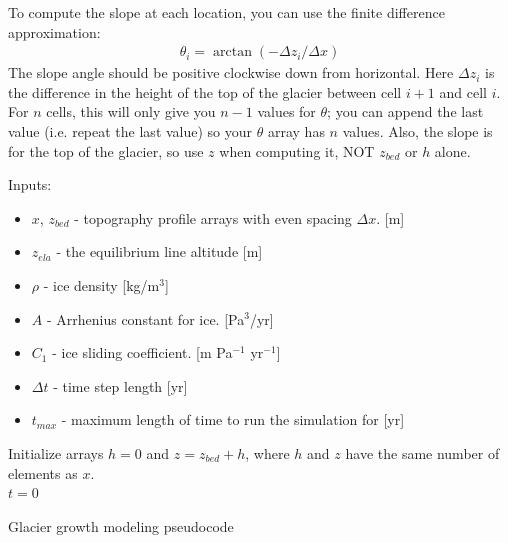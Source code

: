 \documentclass[11pt, oneside]{article}   	%
\begin{document}
To compute the slope at each location, you can use the finite difference approximation:
\begin{eqnarray}
\theta_i = \arctan(-\Delta z_i /\Delta x)
\end{eqnarray}
 The slope angle should be positive clockwise down from horizontal. Here $\Delta z_i$ is the difference in the height of the top of the glacier between cell $i+1$ and cell $i$. For $n$ cells, this will only give you $n-1$ values for $\theta$; you can append the last value (i.e. repeat the last value) so your $\theta$ array has $n$ values.  Also, the slope is for the top of the glacier, so use $z$ when computing it, NOT $z_{bed}$ or $h$ alone.

\begin{algorithm}[H]
\label{pseudocode} %
	Inputs:
 \begin{itemize}
\item $x$, $z_{bed}$ - topography profile arrays  with even spacing $\Delta x$. [m]
\item $z_{ela}$   - the equilibrium line altitude [m]
\item $\rho$  - ice density [kg/m$^3$]
\item $A$ - Arrhenius constant for ice. [Pa$^3$/yr]
\item $C_1$ - ice sliding coefficient. [m Pa$^{-1}$ yr$^{-1}$]
\item $\Delta t$ - time step length [yr]
\item  $t_{max}$ - maximum length of time to run the simulation for [yr]	
\end{itemize}
Initialize arrays $h = 0$  and $z = z_{bed} + h$, where $h$ and $z$ have the same number of elements as $x$.\\
 $t = 0$ \\
 \caption{Glacier growth modeling pseudocode}
\end{algorithm}
\end{document}
